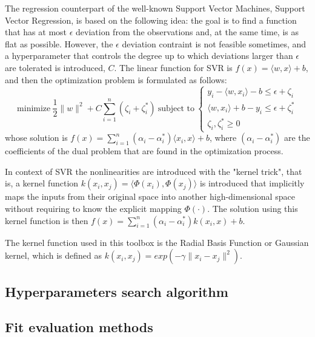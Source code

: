 \documentclass{article}
\begin{document}
\begin{itemize}
The regression counterpart of the well-known Support Vector Machines, Support Vector Regression, is based on the following idea: the goal is to find a function that has at most $\epsilon$ deviation from the observations and, at the same time, is as flat as possible. However, the $\epsilon$ deviation contraint is not feasible sometimes, and a hyperparameter that controls the degree up to which deviations larger than $\epsilon$ are tolerated is introduced, $C$. The linear function for SVR is $ f(x) = \langle w , x \rangle + b $, and then the optimization problem is formulated as follows:
\begin{equation}
	\text{minimize}\ \frac{1}{2}\|w\|^2 + C \sum_{i=1}^{n} (\zeta_i + \zeta^*_i)\ \text{subject to}\ \begin{cases}
	y_i - \langle w,x_i \rangle - b \leq \epsilon + \zeta_i \\
	\langle w,x_i \rangle + b - y_i \leq \epsilon + \zeta^*_i \\
	\zeta_i, \zeta^*_i \geq 0
	\end{cases}
\end{equation}
whose solution is $ f(x) = \sum_{i=1}^{n} (\alpha_i - \alpha^*_i)\langle x_i , x \rangle + b $, where $ (\alpha_i - \alpha^*_i) $ are the coefficients of the dual problem that are found in the optimization process.

In context of SVR the nonlinearities are introduced with the "kernel trick", that is, a kernel function $ k(x_i, x_j) = \langle \Phi(x_i), \Phi(x_j) \rangle $ is introduced that implicitly maps the inputs from their original space into another high-dimensional space without requiring to know the explicit mapping $ \Phi(\cdot) $. The solution using this kernel function is then $ f(x) = \sum_{i=1}^{n} (\alpha_i - \alpha^*_i)k(x_i, x) + b$. 

The kernel function used in this toolbox is the Radial Basis Function or Gaussian kernel, which is defined as $ k(x_i, x_j) = exp(-\gamma \|x_i - x_j\|^2)$.
\end{itemize}

\subsection{Hyperparameters search algorithm}

\subsection{Fit evaluation methods}
\end{document}
